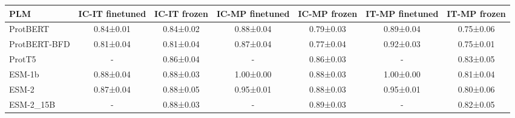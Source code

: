 \begin{tabular}{lcccccc}
\toprule
         \textbf{PLM} & \textbf{IC-IT finetuned} & \textbf{IC-IT frozen} & \textbf{IC-MP finetuned} & \textbf{IC-MP frozen} & \textbf{IT-MP finetuned} & \textbf{IT-MP frozen} \\
\midrule
    ProtBERT &       0.84±0.01 &    0.84±0.02 &       0.88±0.04 &    0.79±0.03 &       0.89±0.04 &    0.75±0.06 \\
ProtBERT-BFD &       0.81±0.04 &    0.81±0.04 &       0.87±0.04 &    0.77±0.04 &       0.92±0.03 &    0.75±0.01 \\
      ProtT5 &               - &    0.86±0.04 &               - &    0.86±0.03 &               - &    0.83±0.05 \\
      ESM-1b &       0.88±0.04 &    0.88±0.03 &       1.00±0.00 &    0.88±0.03 &       1.00±0.00 &    0.81±0.04 \\
       ESM-2 &       0.87±0.04 &    0.88±0.05 &       0.95±0.01 &    0.88±0.03 &       0.95±0.01 &    0.80±0.06 \\
   ESM-2\_15B &               - &    0.88±0.03 &               - &    0.89±0.03 &               - &    0.82±0.05 \\
\bottomrule
\end{tabular}

